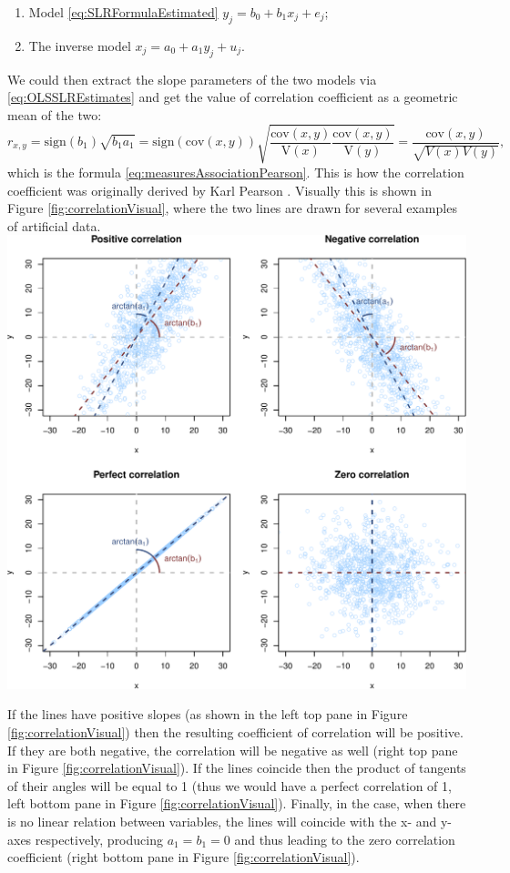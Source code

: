 \documentclass[
]{book}
\providecommand{\tightlist}{%
  \setlength{\itemsep}{0pt}\setlength{\parskip}{0pt}}
\theoremstyle{definition}
\theoremstyle{definition}
\theoremstyle{definition}
\theoremstyle{definition}
\theoremstyle{remark}
\begin{document}
\begin{enumerate}
\def\labelenumi{\arabic{enumi}.}
\tightlist
\item
  Model \eqref{eq:SLRFormulaEstimated} \(y_j = b_0 + b_1 x_j + e_j\);
\item
  The inverse model \(x_j = a_0 + a_1 y_j + u_j\).
\end{enumerate}

We could then extract the slope parameters of the two models via \eqref{eq:OLSSLREstimates} and get the value of correlation coefficient as a geometric mean of the two:
\begin{equation}
    r_{x,y} = \mathrm{sign}(b_1) \sqrt{{b}_1 a_1} = \mathrm{sign}(\mathrm{cov}(x,y)) \sqrt{\frac{\mathrm{cov}(x,y)}{\mathrm{V}(x)} \frac{\mathrm{cov}(x,y)}{\mathrm{V}(y)}} = \frac{\mathrm{cov}(x,y)}{\sqrt{V(x)V(y)}} ,
    \label{eq:correlationDerivationPearson}
\end{equation}
which is the formula \eqref{eq:measuresAssociationPearson}. This is how the correlation coefficient was originally derived by Karl Pearson \citep{PearsonPaper}. Visually this is shown in Figure \ref{fig:correlationVisual}, where the two lines are drawn for several examples of artificial data.
\includegraphics{Svetunkov---Statistics-for-Business-Analytics_files/figure-latex/correlationVisual-1.pdf}

If the lines have positive slopes (as shown in the left top pane in Figure \ref{fig:correlationVisual}) then the resulting coefficient of correlation will be positive. If they are both negative, the correlation will be negative as well (right top pane in Figure \ref{fig:correlationVisual}). If the lines coincide then the product of tangents of their angles will be equal to 1 (thus we would have a perfect correlation of 1, left bottom pane in Figure \ref{fig:correlationVisual}). Finally, in the case, when there is no linear relation between variables, the lines will coincide with the x- and y- axes respectively, producing \(a_1=b_1=0\) and thus leading to the zero correlation coefficient (right bottom pane in Figure \ref{fig:correlationVisual}).
\end{document}
